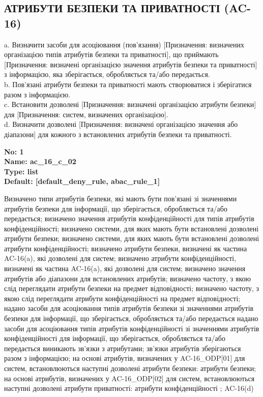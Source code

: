 \documentclass{article}
\begin{document}
\subsection{АТРИБУТИ БЕЗПЕКИ ТА ПРИВАТНОСТІ (AC-16)}
a. Визначити засоби для асоціювання (пов'язання) [Призначення: визначених організацією типів атрибутів безпеки та приватності], що приймають [Призначення: визначені організацією значення атрибутів безпеки та приватності] з інформацією, яка зберігається, обробляється та/або передається.\\ 
b. Пов'язані атрибути безпеки та приватності мають створюватися і зберігатися разом з інформацією.\\ 
c. Встановити дозволені [Призначення: визначені організацією атрибути безпеки] для [Призначення: систем, визначених організацією].\\ 
d. Визначити дозволені [Призначення: визначені організацією значення або діапазони] для кожного з встановлених атрибутів безпеки та приватності.

\vspace{10pt}
{\footnotesize\bfseries
No: 1\\
Name: ac\_16\_c\_02\\
Type: list\\
Default: [\textquotedbl{}default\_deny\_rule\textquotedbl{}, \textquotedbl{}abac\_rule\_1\textquotedbl{}]
}

{\footnotesize Визначено типи атрибутів безпеки, які мають бути пов'язані зі значеннями атрибутів безпеки для інформації, що зберігається, обробляється та/або передається; визначено значення атрибутів конфіденційності для типів атрибутів конфіденційності; визначено системи, для яких мають бути встановлені дозволені атрибути безпеки; визначено системи, для яких мають бути встановлені дозволені атрибути конфіденційності; визначено атрибути безпеки, визначені як частина AC-16(a), які дозволені для систем; визначено атрибути конфіденційності, визначені як частина AC-16(a), які дозволені для систем; визначено значення атрибутів або діапазони для встановлених атрибутів; визначено частоту, з якою слід переглядати атрибути безпеки на предмет відповідності; визначено частоту, з якою слід переглядати атрибути конфіденційності на предмет відповідності; надано засоби для асоціювання типів атрибутів безпеки зі значеннями атрибутів безпеки для інформації, що зберігається, обробляється та/або передається надано засоби для асоціювання типів атрибутів конфіденційності зі значеннями атрибутів конфіденційності для інформації, що зберігається, обробляється та/або передається виникають зв'язки з атрибутами; зв'язки атрибутів зберігаються разом з інформацією; на основі атрибутів, визначених у AC-16\_ODP[01] для систем, встановлюються наступні дозволені атрибути безпеки: атрибути безпеки; на основі атрибутів, визначених у AC-16\_ODP[02] для систем, встановлюються наступні дозволені атрибути приватності: атрибути конфіденційності ; AC-16(d)}
\end{document}
